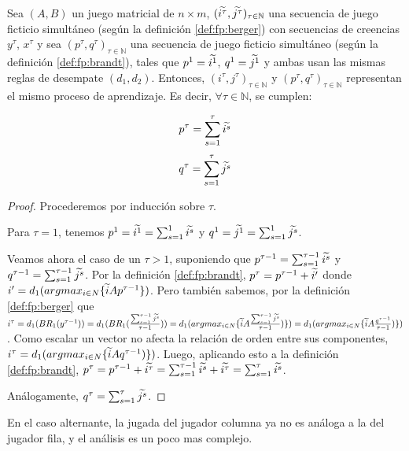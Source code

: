 \begin{lemma} \label{lema:equiv:sim}
    Sea $(A, B)$ un juego matricial de $n \times m$, $(\widetilde{i^\tau}, \widetilde{j^\tau})_{\tau \in \mathbb{N}}$ una secuencia de juego ficticio simultáneo (según la definición \ref{def:fp:berger}) con secuencias de creencias $y^\tau$, $x^\tau$ y sea $(p^\tau, q^\tau)_{\tau \in \mathbb{N}}$ una secuencia de juego ficticio simultáneo (según la definición \ref{def:fp:brandt}), tales que $p^1 = \widetilde{i^1}$, $q^1 = \widetilde{j^1}$ y ambas usan las mismas reglas de desempate $(d_1, d_2)$. Entonces, $(i^\tau, j^\tau)_{\tau \in \mathbb{N}}$ y $(p^\tau, q^\tau)_{\tau \in \mathbb{N}}$ representan el mismo proceso de aprendizaje. Es decir, $\forall \tau \in \mathbb{N}$, se cumplen:

    \[ p^{\tau} = \sum_{s=1}^\tau{\widetilde{i^s}} \]
    \[ q^{\tau} = \sum_{s=1}^\tau{\widetilde{j^s}} \]

\end{lemma}
\begin{proof}
    Procederemos por inducción sobre $\tau$.

    Para $\tau = 1$, tenemos $p^1 = \widetilde{i^1} = \sum_{s=1}^1{\widetilde{i^s}}$ y $q^1 = \widetilde{j^1} = \sum_{s=1}^1{\widetilde{j^s}}$.

    Veamos ahora el caso de un $\tau > 1$, suponiendo que $p^{\tau-1} = \sum_{s=1}^{\tau-1}{\widetilde{i^s}}$ y $q^{\tau-1} = \sum_{s=1}^{\tau-1}{\widetilde{j^s}}$.
    Por la definición \ref{def:fp:brandt}, $p^\tau = p^{\tau-1} + \widetilde{i'}$ donde $i' = d_1(argmax_{i \in N}\{\widetilde{i}Ap^{\tau-1}\})$.
    Pero también sabemos, por la definición \ref{def:fp:berger}
    que $i^\tau = d_1(BR_1(y^{\tau-1})) = d_1(BR_1(\frac{\sum_{s=1}^{\tau-1} \widetilde{j^s}}{\tau-1})) = d_1(argmax_{i \in N}\{\widetilde{i} A\frac{\sum_{s=1}^{\tau-1} \widetilde{j^s}}{\tau-1})\}) = d_1(argmax_{i \in N}\{\widetilde{i} A\frac{q^{\tau-1}}{\tau-1})\})$.
    Como escalar un vector no afecta la relación de orden entre sus componentes, $i^\tau = d_1(argmax_{i \in N}\{\widetilde{i} Aq^{\tau-1})\})$.
    Luego, aplicando esto a la definición \ref{def:fp:brandt}, $p^\tau = p^{\tau-1} + \widetilde{i^\tau} = \sum_{s=1}^{\tau-1}{\widetilde{i^s}} + \widetilde{i^\tau} = \sum_{s=1}^{\tau}{\widetilde{i^s}}$.
    
    Análogamente, $q^{\tau} = \sum_{s=1}^\tau{\widetilde{j^s}}$.
\end{proof}


En el caso alternante, la jugada del jugador columna ya no es análoga a la del jugador fila, y el análisis es un poco mas complejo.



